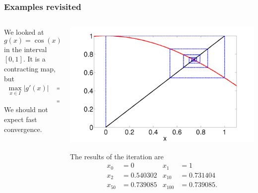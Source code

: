\documentclass{beamer}
\begin{document}
\begin{frame}
  \frametitle{Examples revisited}

  \begin{overlayarea}{\textwidth}{\textheight}
    {
      \begin{columns}
        \begin{column}{0.475\textwidth}
          We looked at
          \begin{equation*}
            g(x) = \cos(x)
          \end{equation*}
          in the interval $[0, 1]$. It is a contracting map, but
          \begin{align*}
            \max_{x \in I} |g'(x)| & = \sin(1) \\
            & = 0.84147.
          \end{align*}
          We should not expect fast convergence.
        \end{column}
        \begin{column}{0.525\textwidth}
          \begin{center}
            \includegraphics[width=\textwidth]{figures/cos_plotmap_final}
          \end{center}
          The results of the iteration are
          \begin{align*}
            x_0 & = 0 &
            x_1 & = 1 \\
            x_2 & = 0.540302 &
            x_{10} & = 0.731404 \\
            x_{50} & = 0.739085 &
            x_{100} & = 0.739085.
          \end{align*}
        \end{column}
      \end{columns}
}
\end{overlayarea}
\end{frame}
\end{document}
